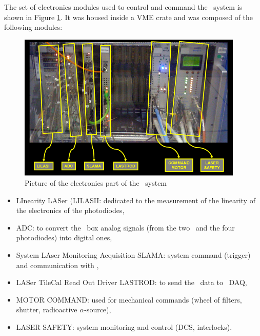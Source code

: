 \begin{itemize}
	The set of electronics modules used to control and command the \lasa~system is shown in Figure \ref{fig:lasaelectronics}. It was housed inside a VME crate and was composed of the following modules:
	\begin{figure}[htbp]
			\centering
			\includegraphics[height=7cm]{figures/Electronics.png}
			\caption{Picture of the electronics part of the \lasi~system}\label{fig:lasaelectronics}
		\end{figure}	
		
	\begin{itemize}
	\item LInearity LASer {\sc (LILASII}: dedicated to the measurement of the linearity of the electronics of the photodiodes,
	\item {\sc ADC}: to convert the \las~box analog signals (from the two \pmts~and the four photodiodes) into digital ones,
	\item System LAser Monitoring Acquisition {\sc SLAMA}: system command (trigger) and communication with \atlas,
	\item LASer TileCal Read Out Driver {\sc LASTROD}: to send the \las~data to \atlas~DAQ,
	\item {\sc MOTOR COMMAND}: used for mechanical commands (wheel of filters, shutter, radioactive $\alpha$-source),
	\item LASER SAFETY: system monitoring and control (DCS, interlocks).
	\end{itemize}
	
\end{itemize}



